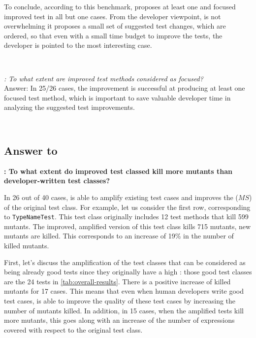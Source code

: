 To conclude, according to this benchmark, \dspot proposes at least one and focused improved test in all but one cases. 
From the developer viewpoint, \dspot is not overwhelming it proposes a small set of suggested test changes, which are ordered, so that even with a small time budget to improve the tests, the developer is pointed to the most interesting case.

~\\
\begin{mdframed}
	\textit{\rqcandidates{}: To what extent are improved test methods considered as focused?}\\
	Answer: In 25/26 cases, the improvement is successful at producing at least one focused test method, which is important to save valuable developer time in analyzing the suggested test improvements.
\end{mdframed}
~\\



\subsection{Answer to \rqeffectiveness}
\label{subsec:test-improvement:experiment-results:rq3}

\textbf{\rqeffectiveness: To what extent do improved test classed kill more mutants than developer-written test classes?}

In 26 out of 40 cases, \dspot is able to amplify existing test cases and improves the \ms ($MS$) of the original test class.
For example, let us consider the first row, corresponding to \texttt{TypeNameTest}. 
This test class originally includes 12 test methods that kill 599 mutants. 
The improved, amplified version of this test class kills 715 mutants,  new mutants are killed.
This corresponds to an increase of 19\% in the number of killed mutants.

First, let's discuss the amplification of the test classes that can be considered as being already good tests since they originally have a high \ms:
those good test classes are the 24 tests in \autoref{tab:overall-results}.
There is a positive increase of killed mutants for 17 cases.
This means that even when human developers write good test cases, \dspot is able to improve the quality of these test cases by increasing the number of mutants killed. 
In addition, in 15 cases, when the amplified tests kill more mutants, this goes along with an increase of the number of expressions covered with respect to the original test class.

